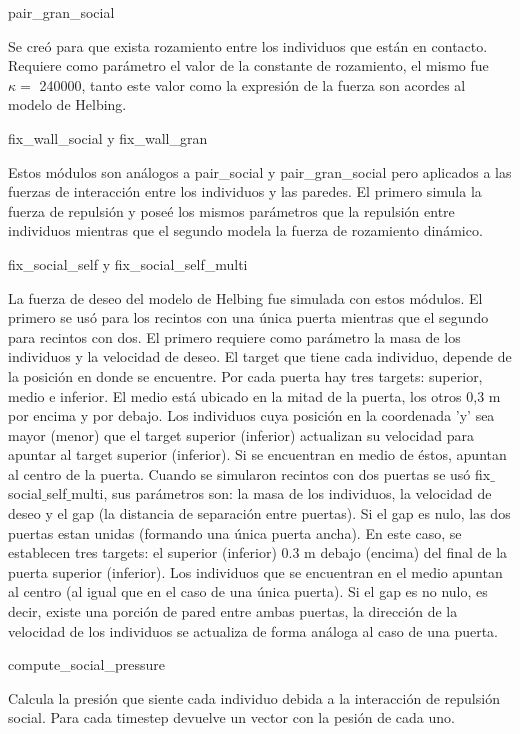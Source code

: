 {\Large pair\_gran\_social}

Se creó para que exista rozamiento entre los individuos que están en contacto. Requiere como parámetro el valor de la constante de rozamiento, el mismo fue $\kappa =$ 240000, tanto este valor como la expresión de la fuerza son acordes al modelo de Helbing.

{\Large fix\_wall\_social y fix\_wall\_gran}

Estos módulos son análogos a pair\_social y pair\_gran\_social pero aplicados a las fuerzas de interacción entre los individuos y las paredes. El primero simula la fuerza de repulsión y poseé los mismos parámetros que la repulsión entre individuos mientras que el segundo modela la fuerza de rozamiento dinámico. 

{\Large fix\_social\_self y fix\_social\_self\_multi}

La fuerza de deseo del modelo de Helbing fue simulada con estos módulos. El primero se usó para los recintos con una única puerta mientras que el segundo para recintos con dos. 
El primero requiere como parámetro la masa de los individuos y la velocidad de deseo. El target que tiene cada individuo, depende de la posición en donde se encuentre. Por cada puerta hay tres targets: superior, medio e inferior. El medio está ubicado en la mitad de la puerta, los otros 0,3 m por encima y por debajo.  Los individuos cuya posición en la coordenada 'y' sea mayor (menor) que el target superior (inferior) actualizan su velocidad para apuntar al target superior (inferior). Si se encuentran en medio de éstos, apuntan al centro de la puerta. 
Cuando se simularon recintos con dos puertas se usó fix$\_$social$\_$self$\_$multi, sus parámetros son: la masa de los individuos, la velocidad de deseo y el gap (la distancia de separación entre puertas). Si el gap es nulo, las dos puertas estan unidas (formando una única puerta ancha). En este caso, se establecen tres targets: el superior (inferior) 0.3 m debajo (encima) del final de la puerta superior (inferior). Los individuos que se encuentran en el medio apuntan al centro (al igual que en el caso de una única puerta).
Si el gap es no nulo, es decir, existe una porción de pared entre ambas puertas, la dirección de la velocidad de los individuos se actualiza de forma análoga al caso de una puerta. 

{\Large compute\_social\_pressure}

Calcula la presión que siente cada individuo debida a la interacción de repulsión social. Para cada timestep devuelve un vector con la pesión de cada uno. 

